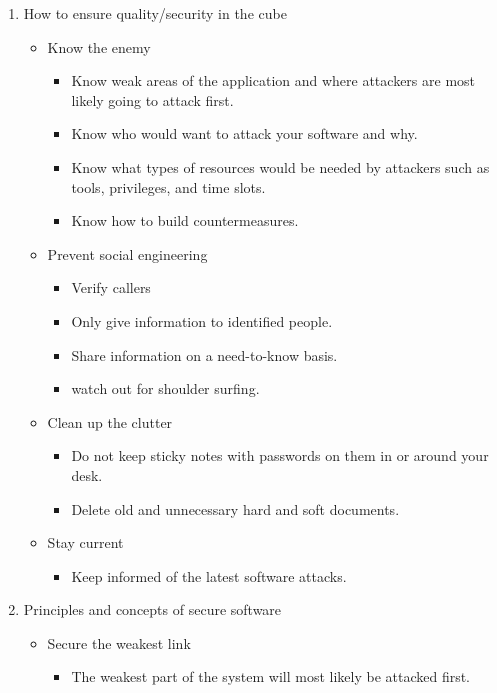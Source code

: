 \documentclass[a4paper]{article}
\begin{document}
\begin{enumerate}
\begin{itemize}
			\end{itemize}
		\item How to ensure quality/security in the cube
			\begin{itemize}
				\item Know the enemy
					\begin{itemize}
						\item Know weak areas of the application and where attackers
							are most likely going to attack first.
						\item Know who would want to attack your software and why.
						\item Know what types of resources would be needed by attackers
							such as tools, privileges, and time slots.
						\item Know how to build countermeasures.
					\end{itemize}
				\item Prevent social engineering
					\begin{itemize}
						\item Verify callers
						\item Only give information to identified people.
						\item Share information on a need-to-know basis.
						\item watch out for shoulder surfing.
					\end{itemize}
				\item Clean up the clutter
					\begin{itemize}
						\item Do not keep sticky notes with passwords on them
							in or around your desk.
						\item Delete old and unnecessary hard and soft documents.
					\end{itemize}
				\item Stay current
					\begin{itemize}
						\item Keep informed of the latest software attacks.
					\end{itemize}
			\end{itemize}
		\item Principles and concepts of secure software
			\begin{itemize}
				\item Secure the weakest link
					\begin{itemize}
						\item The weakest part of the system will most likely be
							attacked first.

\end{itemize}
\end{itemize}
\end{enumerate}
\end{document}
